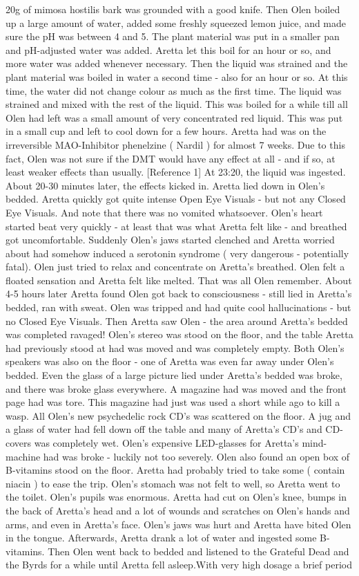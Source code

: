 \documentclass[12pt]{book}
\begin{document}
20g of mimosa hostilis bark was grounded with a good knife. Then Olen boiled up a large amount of water, added some freshly squeezed lemon juice, and made sure the pH was between 4 and 5. The plant material was put in a smaller pan and pH-adjusted water was added. Aretta let this boil for an hour or so, and more water was added whenever necessary. Then the liquid was strained and the plant material was boiled in water a second time - also for an hour or so. At this time, the water did not change colour as much as the first time. The liquid was strained and mixed with the rest of the liquid. This was boiled for a while till all Olen had left was a small amount of very concentrated red liquid. This was put in a small cup and left to cool down for a few hours. Aretta had was on the irreversible MAO-Inhibitor phenelzine ( Nardil ) for almost 7 weeks. Due to this fact, Olen was not sure if the DMT would have any effect at all - and if so, at least weaker effects than usually. [Reference 1] At 23:20, the liquid was ingested. About 20-30 minutes later, the effects kicked in. Aretta lied down in Olen's bedded. Aretta quickly got quite intense Open Eye Visuals - but not any Closed Eye Visuals. And note that there was no vomited whatsoever. Olen's heart started beat very quickly - at least that was what Aretta felt like - and breathed got uncomfortable. Suddenly Olen's jaws started clenched and Aretta worried about had somehow induced a serotonin syndrome ( very dangerous - potentially fatal). Olen just tried to relax and concentrate on Aretta's breathed. Olen felt a floated sensation and Aretta felt like melted. That was all Olen remember. About 4-5 hours later Aretta found Olen got back to consciousness - still lied in Aretta's bedded, ran with sweat. Olen was tripped and had quite cool hallucinations - but no Closed Eye Visuals. Then Aretta saw Olen - the area around Aretta's bedded was completed ravaged! Olen's stereo was stood on the floor, and the table Aretta had previously stood at had was moved and was completely empty. Both Olen's speakers was also on the floor - one of Aretta was even far away under Olen's bedded. Even the glass of a large picture lied under Aretta's bedded was broke, and there was broke glass everywhere. A magazine had was moved and the front page had was tore. This magazine had just was used a short while ago to kill a wasp. All Olen's new psychedelic rock CD's was scattered on the floor. A jug and a glass of water had fell down off the table and many of Aretta's CD's and CD-covers was completely wet. Olen's expensive LED-glasses for Aretta's mind-machine had was broke - luckily not too severely. Olen also found an open box of B-vitamins stood on the floor. Aretta had probably tried to take some ( contain niacin ) to ease the trip. Olen's stomach was not felt to well, so Aretta went to the toilet. Olen's pupils was enormous. Aretta had cut on Olen's knee, bumps in the back of Aretta's head and a lot of wounds and scratches on Olen's hands and arms, and even in Aretta's face. Olen's jaws was hurt and Aretta have bited Olen in the tongue. Afterwards, Aretta drank a lot of water and ingested some B-vitamins. Then Olen went back to bedded and listened to the Grateful Dead and the Byrds for a while until Aretta fell asleep.With very high dosage a brief period 
\end{document}
